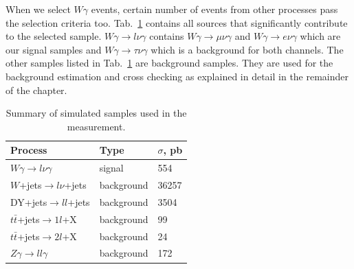 When we select $W\gamma$ events, certain number of events from other processes pass the selection criteria too. Tab.~\ref{tab:mc_bkg_samples} contains all sources that significantly contribute to the selected sample. $W\gamma \rightarrow l\nu\gamma$ contains $W\gamma \rightarrow \mu\nu\gamma$ and $W\gamma \rightarrow e\nu\gamma$ which are our signal samples and $W\gamma \rightarrow \tau\nu\gamma$ which is a background for both channels. The other samples listed in Tab.~\ref{tab:mc_bkg_samples} are background samples. They are used for the background estimation and cross checking as explained in detail in the remainder of the chapter.


\begin{table}[h]
  \small
  \begin{center}
    \caption{Summary of simulated samples used in the measurement.}
    \begin{tabular}{|l|l|l|}
      \hline
      Process                              & Type & $\sigma$, pb  \\ \hline
      $W\gamma \rightarrow l\nu\gamma$     & signal & 554   \\ \hline %
      $W$+jets$ \rightarrow l\nu $+jets   & background & 36257  \\ \hline %
      DY+jets$ \rightarrow ll $+jets     & background & 3504  \\ \hline %
      $t\bar{t}$+jets$\rightarrow 1l$+X    & background & 99    \\ \hline %
      $t\bar{t}$+jets$\rightarrow 2l$+X    & background & 24    \\ \hline
      $Z\gamma \rightarrow ll\gamma$       & background & 172   \\ \hline
    \end{tabular}
    \label{tab:mc_bkg_samples}
  \end{center}
\end{table} 

